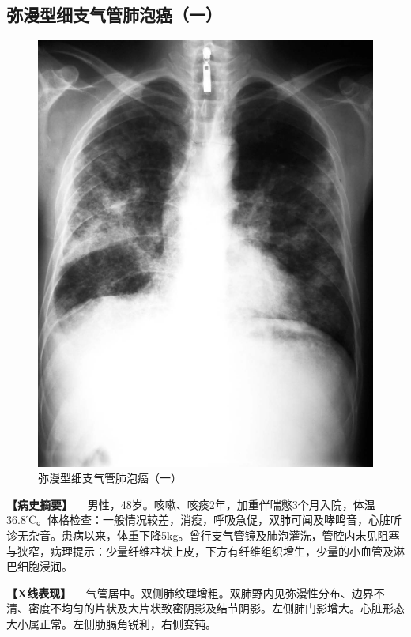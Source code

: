\subsection{弥漫型细支气管肺泡癌（一）}

\begin{figure}[!htbp]
 \centering
 \includegraphics{./images/Image00169.jpg}
 \captionsetup{justification=centering}
 \caption{弥漫型细支气管肺泡癌（一）}
 \label{fig3-8-7}
  \end{figure} 

\textbf{【病史摘要】}
　男性，48岁。咳嗽、咳痰2年，加重伴喘憋3个月入院，体温36.8℃。体格检查：一般情况较差，消瘦，呼吸急促，双肺可闻及哮鸣音，心脏听诊无杂音。患病以来，体重下降5kg。曾行支气管镜及肺泡灌洗，管腔内未见阻塞与狭窄，病理提示：少量纤维柱状上皮，下方有纤维组织增生，少量的小血管及淋巴细胞浸润。

\textbf{【X线表现】}
　气管居中。双侧肺纹理增粗。双肺野内见弥漫性分布、边界不清、密度不均匀的片状及大片状致密阴影及结节阴影。左侧肺门影增大。心脏形态大小属正常。左侧肋膈角锐利，右侧变钝。

